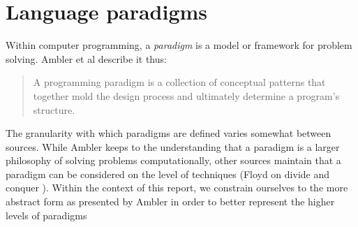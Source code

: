 \section{Language paradigms}
Within computer programming, a \emph{paradigm} is a model or framework for problem solving. Ambler et al \cite{paradigms1992} describe it thus:

\begin{quote}
A programming paradigm is a collection of conceptual patterns that together mold the design process and ultimately determine a program's structure.
\end{quote}

The granularity with which paradigms are defined varies somewhat between sources. While Ambler keeps to the understanding that a paradigm is a larger philosophy of solving problems computationally, other sources maintain that a paradigm can be considered on the level of techniques (Floyd on divide and conquer \cite{paradigms1978}). Within the context of this report, we constrain ourselves to the more abstract form as presented by Ambler in order to better represent the higher levels of paradigms 